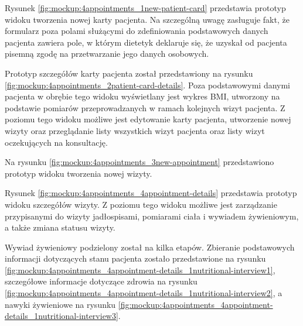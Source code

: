 
Rysunek \ref{fig:mockup:4appointments_1new-patient-card} przedstawia prototyp widoku tworzenia nowej karty pacjenta.
Na szczególną uwagę zasługuje fakt, że formularz poza polami służącymi do zdefiniowania podstawowych danych pacjenta zawiera pole,
w którym dietetyk deklaruje się, że uzyskał od pacjenta pisemną zgodę na przetwarzanie jego danych osobowych.


Prototyp szczegółów karty pacjenta został przedstawiony na rysunku \ref{fig:mockup:4appointments_2patient-card-details}.
Poza podstawowymi danymi pacjenta w obrębie tego widoku wyświetlany jest wykres BMI, utworzony na podstawie pomiarów przeprowadzanych w ramach kolejnych wizyt pacjenta.
Z poziomu tego widoku możliwe jest edytowanie karty pacjenta, utworzenie nowej wizyty oraz przeglądanie listy wszystkich wizyt pacjenta oraz listy wizyt oczekujących na konsultację.


Na rysunku \ref{fig:mockup:4appointments_3new-appointment} przedstawiono prototyp widoku tworzenia nowej wizyty.


Rysunek \ref{fig:mockup:4appointments_4appointment-details} przedstawia prototyp widoku szczegółów wizyty.
Z poziomu tego widoku możliwe jest zarządzanie przypisanymi do wizyty jadłospisami, pomiarami ciała i wywiadem żywieniowym, a także zmiana statusu wizyty.


Wywiad żywieniowy podzielony został na kilka etapów. Zbieranie podstawowych informacji dotyczących stanu pacjenta zostało przedstawione na rysunku \ref{fig:mockup:4appointments_4appointment-details_1nutritional-interview1},
szczegółowe informacje dotyczące zdrowia na rysunku \ref{fig:mockup:4appointments_4appointment-details_1nutritional-interview2}, a nawyki żywieniowe na rysunku \ref{fig:mockup:4appointments_4appointment-details_1nutritional-interview3}.


